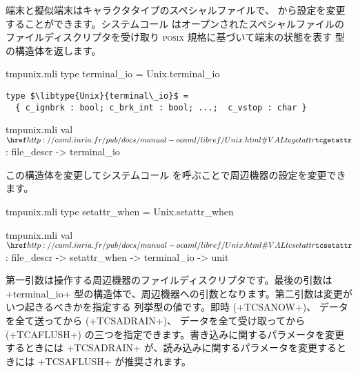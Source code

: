 端末と擬似端末はキャラクタタイプのスペシャルファイルで、 \ocaml から設定を変更することができます。システムコール  はオープンされたスペシャルファイルのファイルディスクリプタを受け取り \textsc{posix} 規格に基づいて端末の状態を表す  型の構造体を返します。
%
\begin{codefile}{tmpunix.mli}
type terminal_io = Unix.terminal_io
\end{codefile}
%
\begin{lstlisting}
type $\libtype{Unix}{terminal\_io}$ =
  { c_ignbrk : bool; c_brk_int : bool; ...;  c_vstop : char }
\end{lstlisting}
%
\begin{listingcodefile}{tmpunix.mli}
val $\libvalue{Unix}{tcgetattr}$ : file_descr -> terminal_io
\end{listingcodefile}
%
この構造体を変更してシステムコール  を呼ぶことで周辺機器の設定を変更できます。
%
\begin{codefile}{tmpunix.mli}
type setattr_when = Unix.setattr_when
\end{codefile}
%
\begin{listingcodefile}{tmpunix.mli}
val $\libvalue{Unix}{tcsetattr}$ : file_descr -> setattr_when -> terminal_io -> unit
\end{listingcodefile}
%

第一引数は操作する周辺機器のファイルディスクリプタです。最後の引数は \ml+terminal_io+ 型の構造体で、周辺機器への引数となります。第二引数は変更がいつ起きるべきかを指定する  列挙型の値です。即時 (\ml+TCSANOW+)、 データを全て送ってから (\ml+TCSADRAIN+)、 データを全て受け取ってから (\ml+TCAFLUSH+) の三つを指定できます。書き込みに関するパラメータを変更するときには \ml+TCSADRAIN+ が、読み込みに関するパラメータを変更するときには \ml+TCSAFLUSH+ が推奨されます。

